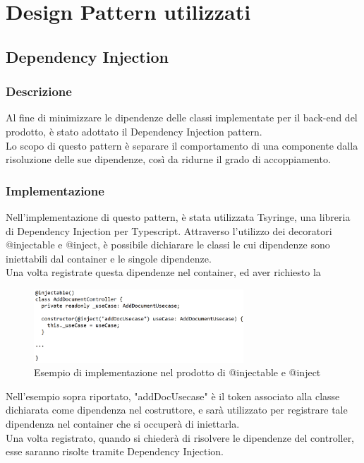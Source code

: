 \section{Design Pattern utilizzati} \label{sec:designpatt}

\subsection{Dependency Injection}
\subsubsection{Descrizione}
Al fine di minimizzare le dipendenze delle classi implementate per il back-end del prodotto, è stato adottato il Dependency Injection pattern.\\
Lo scopo di questo pattern è separare il comportamento di una componente dalla risoluzione delle sue dipendenze, così da ridurne il grado di accoppiamento.
\subsubsection{Implementazione}
Nell'implementazione di questo pattern, è stata utilizzata Tsyringe, una libreria di Dependency Injection per Typescript. Attraverso l'utilizzo dei decoratori @injectable e @inject, è possibile dichiarare le classi le cui dipendenze sono iniettabili dal container e le singole dipendenze.\\
Una volta registrate questa dipendenze nel container, ed aver richiesto la 

\begin{figure}[h!]
    \centering  
    \includegraphics[width=0.7\textwidth]{DIinjectable.png}
    \caption{Esempio di implementazione nel prodotto di @injectable e @inject}
\end{figure}

\noindent Nell'esempio sopra riportato, "addDocUsecase" è il token associato alla classe dichiarata come dipendenza nel costruttore, e sarà utilizzato per registrare tale dipendenza nel container che si occuperà di iniettarla.\\
Una volta registrato, quando si chiederà di risolvere le dipendenze del controller, esse saranno risolte tramite Dependency Injection.

